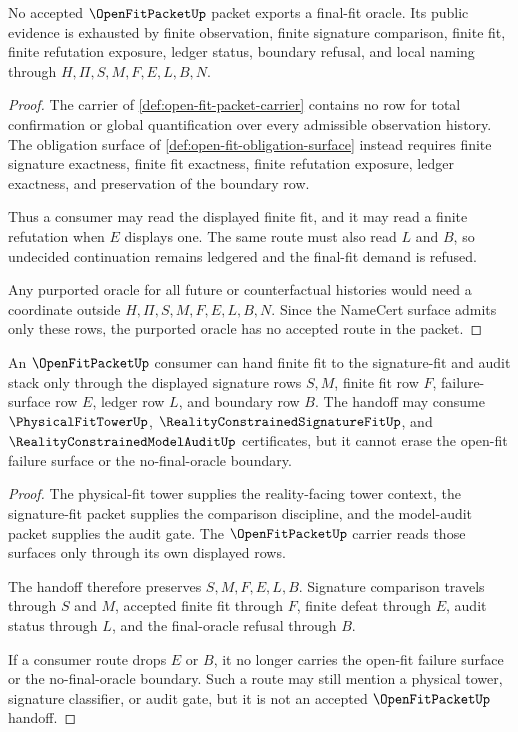 \begin{theorem}
\label{thm:open-fit-no-final-oracle-boundary}
No accepted $\OpenFitPacketUp$ packet exports a final-fit oracle. Its public evidence is exhausted by finite observation, finite signature comparison, finite fit, finite refutation exposure, ledger status, boundary refusal, and local naming through $H,\Pi,S,M,F,E,L,B,N$.
\end{theorem}
\begin{proof}
The carrier of \autoref{def:open-fit-packet-carrier} contains no row for total confirmation or global quantification over every admissible observation history. The obligation surface of \autoref{def:open-fit-obligation-surface} instead requires finite signature exactness, finite fit exactness, finite refutation exposure, ledger exactness, and preservation of the boundary row.

Thus a consumer may read the displayed finite fit, and it may read a finite refutation when $E$ displays one. The same route must also read $L$ and $B$, so undecided continuation remains ledgered and the final-fit demand is refused.

Any purported oracle for all future or counterfactual histories would need a coordinate outside $H,\Pi,S,M,F,E,L,B,N$. Since the NameCert surface admits only these rows, the purported oracle has no accepted route in the packet.
\end{proof}

\begin{theorem}
\label{thm:open-fit-signature-fit-handoff}
An $\OpenFitPacketUp$ consumer can hand finite fit to the signature-fit and audit stack only through the displayed signature rows $S,M$, finite fit row $F$, failure-surface row $E$, ledger row $L$, and boundary row $B$. The handoff may consume $\PhysicalFitTowerUp$, $\RealityConstrainedSignatureFitUp$, and $\RealityConstrainedModelAuditUp$ certificates, but it cannot erase the open-fit failure surface or the no-final-oracle boundary.
\end{theorem}
\begin{proof}
The physical-fit tower supplies the reality-facing tower context, the signature-fit packet supplies the comparison discipline, and the model-audit packet supplies the audit gate. The $\OpenFitPacketUp$ carrier reads those surfaces only through its own displayed rows.

The handoff therefore preserves $S,M,F,E,L,B$. Signature comparison travels through $S$ and $M$, accepted finite fit through $F$, finite defeat through $E$, audit status through $L$, and the final-oracle refusal through $B$.

If a consumer route drops $E$ or $B$, it no longer carries the open-fit failure surface or the no-final-oracle boundary. Such a route may still mention a physical tower, signature classifier, or audit gate, but it is not an accepted $\OpenFitPacketUp$ handoff.
\end{proof}

